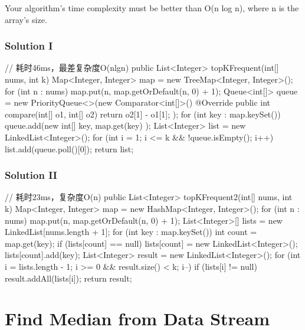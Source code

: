 Your algorithm's time complexity must be better than O(n log n), where n is the array's size.

\subsubsection{Solution I}

\begin{Code}
// 耗时46ms，最差复杂度O(nlgn)
public List<Integer> topKFrequent(int[] nums, int k) {
    Map<Integer, Integer> map = new TreeMap<Integer, Integer>();
    for (int n : nums) {
        map.put(n, map.getOrDefault(n, 0) + 1);
    }
    Queue<int[]> queue = new PriorityQueue<>(new Comparator<int[]>() {
        @Override
        public int compare(int[] o1, int[] o2) {
            return o2[1] - o1[1];
        }
    });
    for (int key : map.keySet()) {
        queue.add(new int[] { key, map.get(key) });
    }
    List<Integer> list = new LinkedList<Integer>();
    for (int i = 1; i <= k && !queue.isEmpty(); i++) {
        list.add(queue.poll()[0]);
    }
    return list;
}
\end{Code}

\newpage

\subsubsection{Solution II}

\begin{Code}
// 耗时23ms，复杂度O(n)
public List<Integer> topKFrequent2(int[] nums, int k) {
    Map<Integer, Integer> map = new HashMap<Integer, Integer>();
    for (int n : nums) {
        map.put(n, map.getOrDefault(n, 0) + 1);
    }
    List<Integer>[] lists = new LinkedList[nums.length + 1];
    for (int key : map.keySet()) {
        int count = map.get(key);
        if (lists[count] == null) {
            lists[count] = new LinkedList<Integer>();
        }
        lists[count].add(key);
    }
    List<Integer> result = new LinkedList<Integer>();
    for (int i = lists.length - 1; i >= 0 && result.size() < k; i--) {
        if (lists[i] != null) {
            result.addAll(lists[i]);
        }
    }
    return result;
}
\end{Code}

\newpage

\section{Find Median from Data Stream} %

